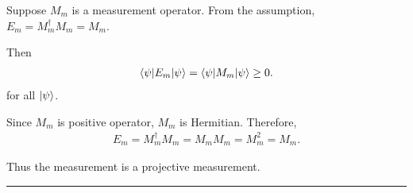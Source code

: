 




Suppose $M_m$ is a measurement operator.
From the assumption, $E_m = M_m^\dagger M_m = M_m$.

Then
\begin{align*}
    \braket{\psi | E_m | \psi} = \braket{\psi | M_m | \psi} \geq 0.
\end{align*}
for all $\ket{\psi}$.

Since $M_m$ is positive operator, $M_m$ is Hermitian.
Therefore,
\begin{align*}
    E_m = M_m^\dagger M_m = M_m M_m = M_m^2 = M_m.
\end{align*}

Thus the measurement is a projective measurement.
\hrule

